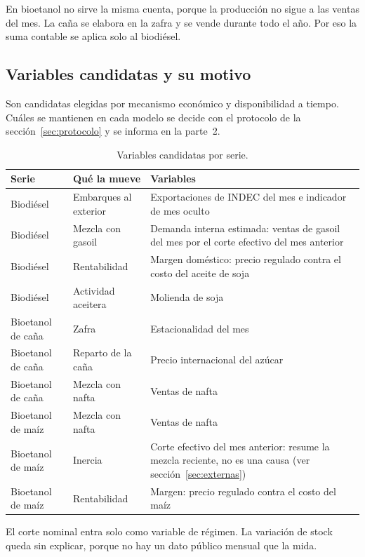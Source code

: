 \documentclass[11pt,a4paper]{article}
\begin{document}
En bioetanol no sirve la misma cuenta, porque la producción no sigue a las ventas del mes. La caña se elabora en la zafra y se vende durante todo el año. Por eso la suma contable se aplica solo al biodiésel.

\subsection{Variables candidatas y su motivo}

Son candidatas elegidas por mecanismo económico y disponibilidad a tiempo. Cuáles se mantienen en cada modelo se decide con el protocolo de la sección~\ref{sec:protocolo} y se informa en la parte~2.

\begin{table}[htbp]
\centering\small
\begin{tabularx}{\textwidth}{@{}P{3.1cm}P{3.1cm}L@{}}
\toprule
\textbf{Serie} & \textbf{Qué la mueve} & \textbf{Variables}\\
\midrule
Biodiésel & Embarques al exterior & Exportaciones de INDEC del mes e indicador de mes oculto\\
Biodiésel & Mezcla con gasoil & Demanda interna estimada: ventas de gasoil del mes por el corte efectivo del mes anterior\\
Biodiésel & Rentabilidad & Margen doméstico: precio regulado contra el costo del aceite de soja\\
Biodiésel & Actividad aceitera & Molienda de soja\\
Bioetanol de caña & Zafra & Estacionalidad del mes\\
Bioetanol de caña & Reparto de la caña & Precio internacional del azúcar\\
Bioetanol de caña & Mezcla con nafta & Ventas de nafta\\
Bioetanol de maíz & Mezcla con nafta & Ventas de nafta\\
Bioetanol de maíz & Inercia & Corte efectivo del mes anterior: resume la mezcla reciente, no es una causa (ver sección~\ref{sec:externas})\\
Bioetanol de maíz & Rentabilidad & Margen: precio regulado contra el costo del maíz\\
\bottomrule
\end{tabularx}
\caption{Variables candidatas por serie.}
\end{table}

El corte nominal entra solo como variable de régimen. La variación de stock queda sin explicar, porque no hay un dato público mensual que la mida.
\end{document}
